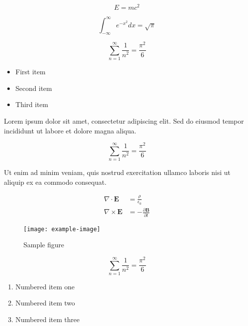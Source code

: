 \documentclass{article}
\begin{document}
\begin{equation}
    E = mc^2
\end{equation}

\begin{equation}
    \int_{-\infty}^{\infty} e^{-x^2} dx = \sqrt{\pi}
\end{equation}


\begin{equation}
    \sum_{n=1}^{\infty} \frac{1}{n^2} = \frac{\pi^2}{6}
\end{equation}

\begin{itemize}
\item First item
\item Second item
\item Third item
\end{itemize}

Lorem ipsum dolor sit amet, consectetur adipiscing elit. Sed do eiusmod tempor incididunt ut labore et dolore magna aliqua.

\begin{equation}
    \sum_{n=1}^{\infty} \frac{1}{n^2} = \frac{\pi^2}{6}
\end{equation}


Ut enim ad minim veniam, quis nostrud exercitation ullamco laboris nisi ut aliquip ex ea commodo consequat.

\begin{align}
    \nabla \cdot \mathbf{E} &= \frac{\rho}{\epsilon_0} \\
    \nabla \times \mathbf{E} &= -\frac{\partial \mathbf{B}}{\partial t}
\end{align}

\begin{figure}[h]
    \centering
    \texttt{[image: example-image]}
    \caption{Sample figure}
    \label{fig:sample}
\end{figure}

\begin{equation}
    \sum_{n=1}^{\infty} \frac{1}{n^2} = \frac{\pi^2}{6}
\end{equation}

\begin{enumerate}
\item Numbered item one
\item Numbered item two
\item Numbered item three
\end{enumerate}
\end{document}
